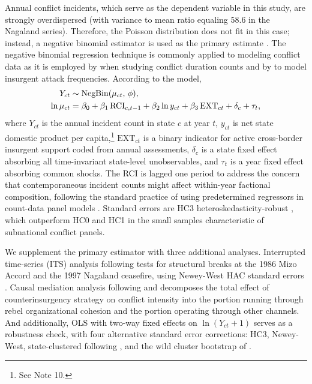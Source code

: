 \documentclass[12pt,a4paper]{article}
\begin{document}
Annual conflict incidents, which serve as the dependent variable in this study, are strongly overdispersed (with variance to mean ratio equaling 58.6 in the Nagaland series). Therefore, the Poisson distribution does not fit in this case; instead, a negative binomial estimator is used as the primary estimate \citep{cameron1998}. The negative binomial regression technique is commonly applied to modeling conflict data as it is employed by \citet{cunningham2009} when studying conflict duration counts and by \citet{lyall2009} to model insurgent attack frequencies. According to the model,
\begin{align}
Y_{ct} &\sim \mathrm{NegBin}(\mu_{ct},\,\phi), \notag\\
\ln \mu_{ct} &= \beta_0 + \beta_1\,\mathrm{RCI}_{c,t-1} + \beta_2 \ln y_{ct} + \beta_3\,\mathrm{EXT}_{ct} + \delta_c + \tau_t,
\end{align}
where $Y_{ct}$ is the annual incident count in state $c$ at year $t$, $y_{ct}$ is net state domestic product per capita,\footnote{See Note 10.} $\mathrm{EXT}_{ct}$ is a binary indicator for active cross-border insurgent support coded from annual assessments, $\delta_c$ is a state fixed effect absorbing all time-invariant state-level unobservables, and $\tau_t$ is a year fixed effect absorbing common shocks. The RCI is lagged one period to address the concern that contemporaneous incident counts might affect within-year factional composition, following the standard practice of using predetermined regressors in count-data panel models \citep{cameron1998}. Standard errors are HC3 heteroskedasticity-robust \citep{mackinnon1985}, which outperform HC0 and HC1 in the small samples characteristic of subnational conflict panels.

We supplement the primary estimator with three additional analyses. Interrupted time-series (ITS) analysis following \citet{shadish2002} tests for structural breaks at the 1986 Mizo Accord and the 1997 Nagaland ceasefire, using Newey-West HAC standard errors \citep{newey1987}. Causal mediation analysis following \citet{baronkenny1986} and \citet{imai2010} decomposes the total effect of counterinsurgency strategy on conflict intensity into the portion running through rebel organizational cohesion and the portion operating through other channels. And additionally, OLS with two-way fixed effects on $\ln(Y_{ct}+1)$ serves as a robustness check, with four alternative standard error corrections: HC3, Newey-West, state-clustered following \citet{bertrand2004}, and the wild cluster bootstrap of \citet{cameron2008}.
\end{document}
